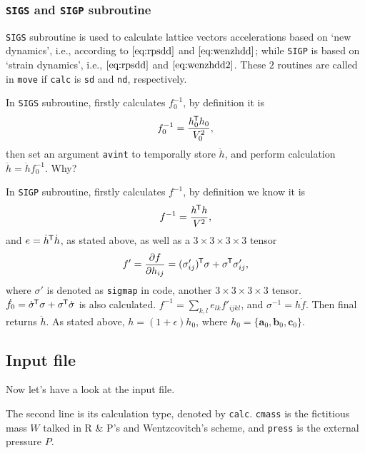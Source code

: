 \subsubsection{\texttt{SIGS} and \texttt{SIGP} subroutine}

\texttt{SIGS} subroutine is used to calculate lattice vectors accelerations
based on `new dynamics', i.e., according to $\eqref{eq:rpsdd}$ and
$\eqref{eq:wenzhdd}$; while \texttt{SIGP} is based on `strain dynamics',
i.e., $\eqref{eq:rpsdd}$ and $\eqref{eq:wenzhdd2}$. These $2$ routines
are called in \texttt{move} if \texttt{calc} is \texttt{sd} and \texttt{nd}, respectively.

In \texttt{SIGS} subroutine,
firstly calculates $f_0^{-1}$, by definition it is
\begin{equation}
  f_0^{-1} = \frac{ h_0 ^{\mkern-1.5mu\mathsf{T}} h_0}{ V_0^2 },
\end{equation}
then set an argument \texttt{avint} to temporally store $\ddot{h}$,
and perform calculation $\ddot{h} = \ddot{h} f_0^{-1}$. Why?


In \texttt{SIGP} subroutine,
firstly calculates $f^{-1}$, by definition we know it is
\begin{equation}
	f^{-1} = \frac{ h ^{\mkern-1.5mu\mathsf{T}} h }{ V^2 },
\end{equation}
and $e = \dot{ h }^{\mkern-1.5mu\mathsf{T}} \dot{ h }$, as stated above, as well as
a $3\times 3 \times 3 \times 3$ tensor
\begin{equation}
	f ' = \frac{ \partial f }{ \partial h_{ij} } = (\sigma'_{ij})^{\mkern-1.5mu\mathsf{T}} \sigma
	+ \sigma ^{\mkern-1.5mu\mathsf{T}} \sigma'_{ij},
\end{equation}
where $\sigma'$ is denoted as \texttt{sigmap} in code, another $3\times 3
\times 3 \times 3$ tensor.
$\dot{f}_0 = \dot{ \sigma } ^{\mkern-1.5mu\mathsf{T}} \sigma + \sigma ^{\mkern-1.5mu\mathsf{T}} \dot{ \sigma }$ is
also calculated.
$f^{-1} = \sum_{k, l} e_{lk} f'_{ijkl}$, and $\sigma^{-1} = h \dot{ f }$.
Then final returns $\ddot{h}$. As stated above, $h = (1 + \epsilon) h_0$,
where $h_0 = \{ \bm{a}_0, \bm{b}_0, \bm{c}_0 \}$.


\subsection{Input file}

Now let's have a look at the input file.

The second line is its calculation type, denoted by
\texttt{calc}. \texttt{cmass} is the fictitious mass $W$ talked
in R & P's and Wentzcovitch's scheme, and \texttt{press} is the
external pressure $P$.
